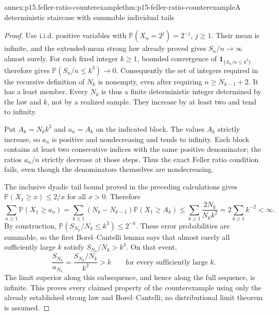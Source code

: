 \begin{annexitem}{annex:p15.feller-ratio-counterexample}{thm:p15-feller-ratio-counterexample}{A deterministic staircase with summable individual tails}
\begin{proof}
Use i.i.d. positive variables with
\(\mathbb P(X_n=2^j)=2^{-j}\), \(j\geq1\).
Their mean is infinite, and the extended-mean strong law already
proved gives \(S_n/n\to\infty\) almost surely.
For each fixed integer \(k\geq1\), bounded convergence of
\(\mathbf1_{\{S_n/n\leq k^3\}}\) therefore gives
\(\mathbb P(S_n/n\leq k^3)\to0\).
Consequently the set of integers required in the recursive definition
of \(N_k\) is nonempty, even after requiring \(n\geq N_{k-1}+2\).
It has a least member. Every \(N_k\) is thus a finite deterministic
integer determined by the law and \(k\), not by a realized sample.
They increase by at least two and tend to infinity.

Put \(A_k=N_k k^2\) and \(a_n=A_k\) on the indicated block.
The values \(A_k\) strictly increase, so \(a_n\) is positive
and nondecreasing and tends to infinity. Each block contains at
least two consecutive indices with the same positive denominator;
the ratios \(a_n/n\) strictly decrease at those steps.
Thus the exact Feller ratio condition fails, even though the
denominators themselves are nondecreasing.

The inclusive dyadic tail bound proved in the preceding calculations
gives \(\mathbb P(X_1\geq x)\leq2/x\) for all \(x>0\).
Therefore
\[
 \sum_{n\geq1}\mathbb P(X_1\geq a_n)
  =\sum_{k\geq1}(N_k-N_{k-1})\mathbb P(X_1\geq A_k)
  \leq\sum_{k\geq1}\frac{2N_k}{N_k k^2}
  =2\sum_{k\geq1}k^{-2}<\infty.
\]
By construction,
\(\mathbb P(S_{N_k}/N_k\leq k^3)\leq2^{-k}\).
These error probabilities are summable, so the first Borel--Cantelli
lemma says that almost surely all sufficiently large \(k\) satisfy
\(S_{N_k}/N_k>k^3\). On that event,
\[
 \frac{S_{N_k}}{a_{N_k}}
       =\frac{S_{N_k}/N_k}{k^2}>k
 \qquad\text{for every sufficiently large }k.
\]
The limit superior along this subsequence, and hence along the full
sequence, is infinite. This proves every claimed property of the
counterexample using only the already established strong law and
Borel--Cantelli; no distributional limit theorem is assumed.
\end{proof}
\end{annexitem}
